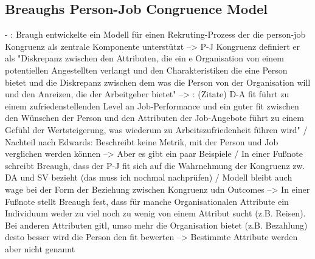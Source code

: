 \subsection{Breaughs Person-Job Congruence Model}
\label{ch:notizen:rekcruitingUndSelektion:breaugh}
- \cite[S. 36]{edwards:2008}: Braugh entwickelte ein Modell für einen Rekruting-Prozess der die person-job Kongruenz als zentrale Komponente unterstützt --> P-J Kongruenz definiert er als "Diskrepanz zwischen den Attributen, die ein e Organisation von einem potentiellen Angestellten verlangt und den Charakteristiken die eine Person bietet und die Diskrepanz zwischen dem was die Person von der Organisation will und den Anreizen, die der Arbeitgeber bietet" --> \cite[S. 37]{edwards:2008}: (Zitate) D-A fit führt zu einem zufriedenstellenden Level an Job-Performance und ein guter fit zwischen den Wünschen der Person und den Attributen der Job-Angebote führt zu einem Gefühl der Wertsteigerung, was wiederum zu Arbeitszufriedenheit führen wird" / Nachteil nach Edwards: Beschreibt keine Metrik, mit der Person und Job verglichen werden können --> Aber es gibt ein paar Beispiele / In einer Fußnote schreibt Breaugh, dass der P-J fit sich auf die Wahrnehmung der Kongruenz zw. DA und SV bezieht (das muss ich nochmal nachprüfen) / Modell bleibt auch wage bei der Form der Beziehung zwischen Kongruenz udn Outcomes --> In einer Fußnote stellt Breaugh fest, dass für manche Organisationalen Attribute ein Individuum weder zu viel noch zu wenig von einem Attribut sucht (z.B. Reisen). Bei anderen Attributen gitl, umso mehr die Organisation bietet (z.B. Bezahlung) desto besser wird die Person den fit bewerten --> Bestimmte Attribute werden aber nicht genannt

